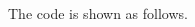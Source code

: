   \begin{multicols}{2}
    \setlength{\columnseprule}{0.2pt}
    \begin{sol}
      The code is shown as follows.
      


\end{sol}
\end{multicols}

